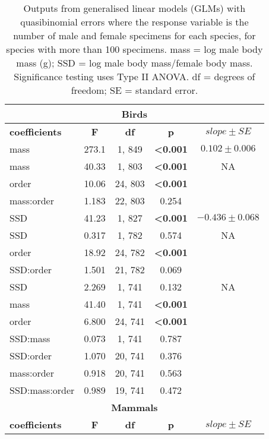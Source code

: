 \begin{longtable}{lcccc}

  \caption{Outputs from generalised linear models (GLMs) with quasibinomial errors where the response variable is the number of male and female specimens for each species, for species with more than 100 specimens. mass = log male body mass (g); SSD = log male body mass/female body mass. Significance testing uses Type II ANOVA. df = degrees of freedom; SE = standard error.} \\ 
  
  \hline
  \multicolumn{5}{c}{\textbf{Birds}} \\
  \hline
  \textbf{coefficients} & \textbf{F} & \textbf{df} & \textbf{p} & \textbf{$slope \pm SE$} \\ 
  \hline

  mass & 273.1 & 1, 849 & \textbf{\textless 0.001} & $0.102 \pm 0.006$ \\
  \hline
  mass & 40.33 & 1, 803 & \textbf{\textless 0.001} & NA \\
  order & 10.06 & 24, 803 & \textbf{\textless 0.001} & \\
  mass:order & 1.183 & 22, 803 & 0.254 & \\
  \hline

  SSD & 41.23 & 1, 827 & \textbf{\textless 0.001} & $-0.436 \pm 0.068$ \\
  \hline
  SSD & 0.317 & 1, 782 & 0.574 & NA \\
  order & 18.92 & 24, 782 & \textbf{\textless 0.001} & \\
  SSD:order & 1.501 & 21, 782 & 0.069 & \\
  \hline

  SSD & 2.269 & 1, 741 & 0.132 & NA \\
  mass & 41.40 & 1, 741 & \textbf{\textless 0.001} &  \\
  order & 6.800 & 24, 741 & \textbf{\textless 0.001} & \\
  SSD:mass & 0.073 & 1, 741 & 0.787 & \\
  SSD:order & 1.070 & 20, 741 & 0.376 & \\
  mass:order & 0.918 & 20, 741 & 0.563 & \\
  SSD:mass:order & 0.989 & 19, 741 & 0.472 & \\

  \hline
  \multicolumn{5}{c}{\textbf{Mammals}} \\
  \hline
  \textbf{coefficients} & \textbf{F} & \textbf{df} & \textbf{p} & \textbf{$slope \pm SE$} \\ 
  \hline


\end{longtable}

